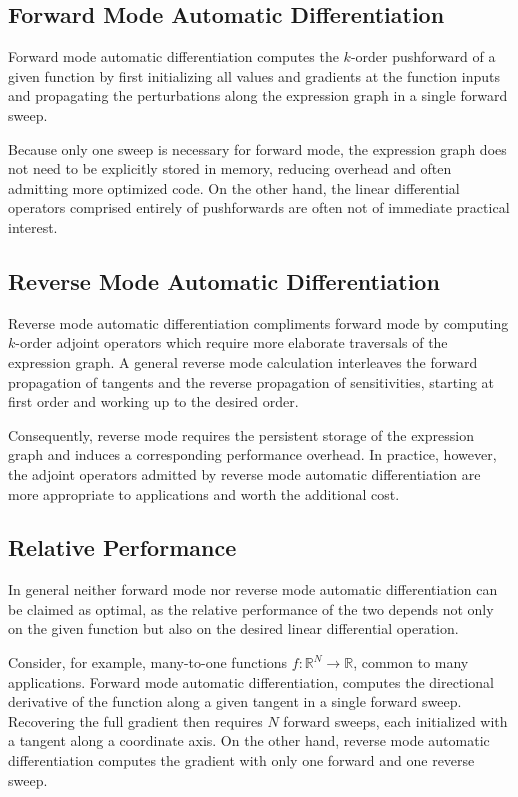 \subsection{Forward Mode Automatic Differentiation}

Forward mode automatic differentiation computes the $k$-order pushforward 
of a given function by first initializing all values and gradients at the function
inputs and propagating the perturbations along the expression graph in a single 
forward sweep.  

Because only one sweep is necessary for forward mode, the expression graph does 
not need to be explicitly stored in memory, reducing overhead and often admitting 
more optimized code.  On the other hand, the linear differential operators comprised 
entirely of pushforwards are often not of immediate practical interest.

\subsection{Reverse Mode Automatic Differentiation}

Reverse mode automatic differentiation compliments forward mode by computing
$k$-order adjoint operators which require more elaborate traversals of the
expression graph.  A general reverse mode calculation interleaves the forward
propagation of tangents and the reverse propagation of sensitivities, starting at
first order and working up to the desired order.

Consequently, reverse mode requires the persistent storage of the expression 
graph and induces a corresponding performance overhead.  In practice, however,
the adjoint operators admitted by reverse mode automatic differentiation are
more appropriate to applications and worth the additional cost.

\subsection{Relative Performance}

In general neither forward mode nor reverse mode automatic differentiation can be
claimed as optimal, as the relative performance of the two depends not only on
the given function but also on the desired linear differential operation.  

Consider, for example, many-to-one functions $f : \mathbb{R}^{N} \rightarrow \mathbb{R}$,
common to many applications.  Forward mode automatic differentiation, computes the 
directional derivative of the function along a given tangent in a single forward sweep.
Recovering the full gradient then requires $N$ forward sweeps, each initialized with
a tangent along a coordinate axis.  On the other hand, reverse mode automatic
differentiation computes the gradient with only one forward and one reverse sweep.  

